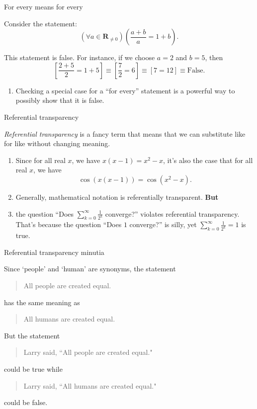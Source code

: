 \documentclass[portrait,fleqn,12pt]{beamer}
\newcommand{\reals}{\mathbf{R}}
\newenvironment{handlist}
   {\begin{enumerate}[\faHandPointRight]
       \addtolength{\itemsep}{0.0\itemsep}}
     {\end{enumerate}}
\begin{document}
\begin{frame}{For every means for every}

Consider the statement:
\begin{equation*}
  \left(\forall a \in \reals_{\neq 0} \right)\left(\frac{a+b}{a} = 1 + b \right).
\end{equation*}

This statement is false. For instance, if we choose $a=2$ and $b=5$, then
\begin{equation*}
    \left[ \frac{2+5}{2} = 1+5 \right] \equiv   \left[ \frac{7}{2} = 6 \right]  \equiv \left[ 7 = 12\right]  \equiv \text{False}.
\end{equation*}

\begin{handlist}
\item Checking a special case for a ``for every''  statement is a powerful way to possibly show that it is false.
\end{handlist}

\end{frame}

\begin{frame}{Referential transparency}

\emph{Referential transparency} is a fancy term that means that we can substitute like for like without changing meaning.  

\begin{handlist}
\item Since for all real $x$, we have $x (x-1) = x^2 -x$, it's also the case that for all real $x$, we have
$$
  \cos(x (x-1)) = \cos(x^2 - x).
$$

\item Generally, mathematical notation is referentially transparent.  \textbf{But}

\item the question ``Does $\sum_{k=0}^\infty \frac{1}{2^k}$ converge?'' violates referential transparency. That's because
the question ``Does  $1 $ converge?'' is silly, yet  $\sum_{k=0}^\infty \frac{1}{2^k} = 1$ is true.
\end{handlist}

\end{frame}

\begin{frame}{Referential transparency minutia}


  Since `people' and `human' are synonyms, the statement
  \begin{quote}
     All people are created equal.
  \end{quote}
has the same meaning as
\begin{quote}
  All humans are created equal.
\end{quote}
But the statement
\begin{quote}
  Larry said, ``All people are created equal."
\end{quote}
could be true while 
\begin{quote}
  Larry said, ``All humans are created equal."
\end{quote}
could be false.


  
\end{frame}
\end{document}
